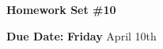 


\thispagestyle{fancy}






\begin{center}
{\huge \textbf{Homework Set \#10 }}
\large

{\textbf{ Due Date:}  {\textbf{Friday}} April 10th  } 
\end{center}

